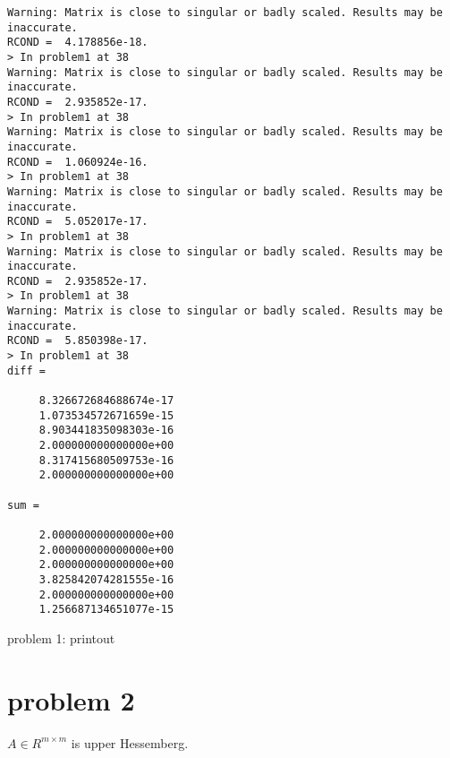 \documentclass[10pt]{article}
\begin{document}
\begin{program}
 \begin{verbatim}
Warning: Matrix is close to singular or badly scaled. Results may be inaccurate.
RCOND =  4.178856e-18. 
> In problem1 at 38 
Warning: Matrix is close to singular or badly scaled. Results may be inaccurate.
RCOND =  2.935852e-17. 
> In problem1 at 38 
Warning: Matrix is close to singular or badly scaled. Results may be inaccurate.
RCOND =  1.060924e-16. 
> In problem1 at 38 
Warning: Matrix is close to singular or badly scaled. Results may be inaccurate.
RCOND =  5.052017e-17. 
> In problem1 at 38 
Warning: Matrix is close to singular or badly scaled. Results may be inaccurate.
RCOND =  2.935852e-17. 
> In problem1 at 38 
Warning: Matrix is close to singular or badly scaled. Results may be inaccurate.
RCOND =  5.850398e-17. 
> In problem1 at 38 
diff =

     8.326672684688674e-17
     1.073534572671659e-15
     8.903441835098303e-16
     2.000000000000000e+00
     8.317415680509753e-16
     2.000000000000000e+00

sum =

     2.000000000000000e+00
     2.000000000000000e+00
     2.000000000000000e+00
     3.825842074281555e-16
     2.000000000000000e+00
     1.256687134651077e-15
  \end{verbatim}
\caption{problem 1: printout}
\end{program}


\section{problem 2}
$A\in R^{m \times m}$ is upper Hessemberg.
\end{document}
